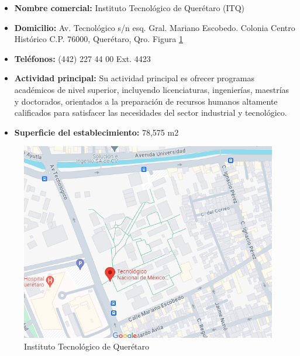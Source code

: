 \begin{itemize}
    \item\textbf{Nombre comercial:} Instituto Tecnológico de Querétaro (ITQ)
    \item\textbf{Domicilio:} Av. Tecnológico s/n esq. Gral. Mariano Escobedo. Colonia Centro Histórico C.P. 76000, Querétaro, Qro. Figura \ref{fig:plano.png}
    \item\textbf{Teléfonos:} (442) 227 44 00 Ext. 4423 
    \item\textbf{Actividad principal:} Su actividad principal es ofrecer programas académicos de nivel superior, incluyendo licenciaturas, ingenierías, maestrías y doctorados, orientados a la preparación de recursos humanos altamente calificados para satisfacer las necesidades del sector industrial y tecnológico.
    \item\textbf{Superficie del establecimiento:} 78,575 m2
\end{itemize}
%
%
\begin{figure}[H]
    \centering
    \includegraphics[scale=0.4]{10/Img/plano.png}
    \caption{Instituto Tecnológico de Querétaro}
    \label{fig:plano.png}
\end{figure}
%
%
